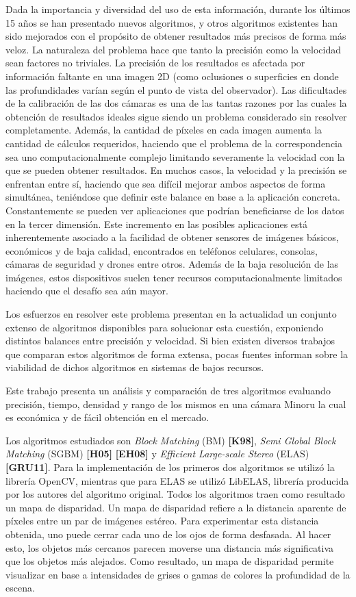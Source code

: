 \documentclass[11pt,a4paper,titlepage]{article}
\newcommand{\Cite}[1]{\textbf{[#1]}}
\begin{document}
Dada la importancia y diversidad del uso de esta información, durante los últimos 15 años se han presentado nuevos algoritmos, y otros algoritmos existentes han sido mejorados con el propósito de obtener resultados más precisos de forma más veloz. La naturaleza del problema hace que tanto la precisión como la velocidad sean factores no triviales. La precisión de los resultados es afectada por información faltante en una imagen 2D (como oclusiones o superficies en donde las profundidades varían según el punto de vista del observador). Las dificultades de la calibración de las dos cámaras es una de las tantas razones por las cuales la obtención de resultados ideales sigue siendo un problema considerado sin resolver completamente. Además, la cantidad de píxeles en cada imagen aumenta la cantidad de cálculos requeridos, haciendo que el problema de la correspondencia sea uno computacionalmente complejo limitando severamente la velocidad con la que se pueden obtener resultados. En muchos casos, la velocidad y la precisión se enfrentan entre sí, haciendo que sea difícil mejorar ambos aspectos de forma simultánea, teniéndose que definir este balance en base a la aplicación concreta. Constantemente se pueden ver aplicaciones que podrían beneficiarse de los datos en la tercer dimensión. Este incremento en las posibles aplicaciones está inherentemente asociado a la facilidad de obtener sensores de imágenes básicos, económicos y de baja calidad, encontrados en teléfonos celulares, consolas, cámaras de seguridad y drones entre otros. Además de la baja resolución de las imágenes, estos dispositivos suelen tener recursos computacionalmente limitados haciendo que el desafío sea aún mayor.

Los esfuerzos en resolver este problema presentan en la actualidad un conjunto extenso de algoritmos disponibles para solucionar esta cuestión, exponiendo distintos balances entre precisión y velocidad. Si bien existen diversos trabajos que comparan estos algoritmos de forma extensa, pocas fuentes informan sobre la viabilidad de dichos algoritmos en sistemas de bajos recursos.

Este trabajo presenta un análisis y comparación de tres algoritmos evaluando precisión, tiempo, densidad y rango de los mismos en una cámara Minoru la cual es económica y de fácil obtención en el mercado.

Los algoritmos estudiados son \textit{Block Matching} (BM) \Cite{K98}, \textit{Semi Global Block Matching} (SGBM) \Cite{H05} \Cite{EH08} y \textit{Efficient Large-scale Stereo} (ELAS) \Cite{GRU11}. Para la implementación de los primeros dos algoritmos se utilizó la librería OpenCV, mientras que para ELAS se utilizó LibELAS, librería producida por los autores del algoritmo original. Todos los algoritmos traen como resultado un mapa de disparidad. Un mapa de disparidad refiere a la distancia aparente de píxeles entre un par de imágenes estéreo. Para experimentar esta distancia obtenida, uno puede cerrar cada uno de los ojos de forma desfasada. Al hacer esto, los objetos más cercanos parecen moverse una distancia más significativa que los objetos más alejados. Como resultado, un mapa de disparidad permite visualizar en base a intensidades de grises o gamas de colores la profundidad de la escena.
\end{document}
